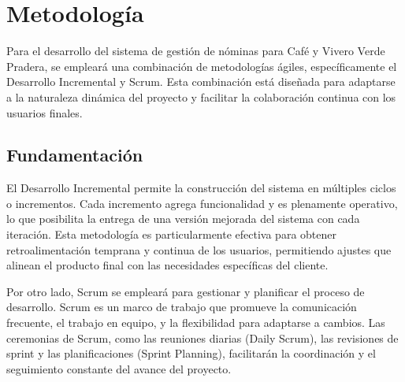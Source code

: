 \chapter{Metodología}

Para el desarrollo del sistema de gestión de nóminas para Café y
Vivero Verde Pradera, se empleará una combinación de metodologías ágiles,
específicamente el Desarrollo Incremental y Scrum. Esta combinación está
diseñada para adaptarse a la naturaleza dinámica del proyecto y facilitar
la colaboración continua con los usuarios finales.

\section{Fundamentación}

El Desarrollo Incremental permite la construcción del sistema en
múltiples ciclos o incrementos. Cada incremento agrega funcionalidad y
es plenamente operativo, lo que posibilita la entrega de una versión mejorada
del sistema con cada iteración. Esta metodología es particularmente efectiva
para obtener retroalimentación temprana y continua de los usuarios, permitiendo
ajustes que alinean el producto final con las necesidades específicas del cliente.

Por otro lado, Scrum se empleará para gestionar y planificar el proceso de
desarrollo. Scrum es un marco de trabajo que promueve la comunicación frecuente,
el trabajo en equipo, y la flexibilidad para adaptarse a cambios. Las ceremonias
de Scrum, como las reuniones diarias (Daily Scrum), las revisiones de sprint y
las planificaciones (Sprint Planning), facilitarán la coordinación y el
seguimiento constante del avance del proyecto.

\newpage


